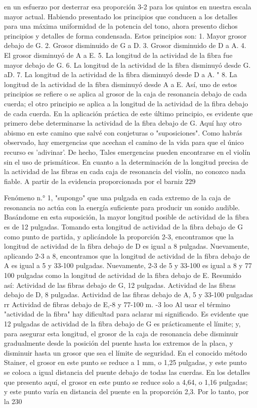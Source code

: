 en un esfuerzo por desterrar esa proporción 3-2 para los quintos
en nuestra escala mayor actual. Habiendo presentado los principios que conducen a los detalles para una máxima uniformidad de la potencia del tono, ahora presento dichos principios y detalles de forma condensada. Estos principios son: 1. Mayor grosor debajo de G. 2. Grosor disminuido de G a D. 3. Grosor disminuido de D a A.
4. El grosor disminuyó de A a E. 5. La longitud de la actividad de la fibra fue mayor debajo de G. 6. La longitud de la actividad de la fibra disminuyó desde G.
aD.
7. La longitud de la actividad de la fibra disminuyó desde D
a A.	"
8. La longitud de la actividad de la fibra disminuyó desde A	
a E.	
Así, uno de estos principios se refiere o se aplica al grosor de la caja de resonancia debajo de cada cuerda; el otro principio se aplica a la longitud de la actividad de la fibra debajo de cada cuerda. En la aplicación práctica de este último principio, es evidente que primero debe determinarse la actividad de la fibra debajo de G. Aquí hay otro abismo en este camino que salvé con conjeturas o "suposiciones". Como habrás observado, hay emergencias que acechan el camino de la vida para
que el único recurso es 'adivinar'. De hecho,
Tales emergencias pueden encontrarse en el violín sin el uso de prismáticos. En cuanto a la determinación de la longitud precisa de la actividad de las fibras en cada caja de resonancia del violín, no conozco nada fiable. A partir de la evidencia proporcionada por el barniz 229

Fenómeno n.° 1, "supongo" que una pulgada en cada extremo de la caja de resonancia no actúa con la energía suficiente para producir un sonido audible. Basándome en esta suposición, la mayor longitud posible de actividad de la fibra es de 12 pulgadas. Tomando esta longitud de actividad de la fibra debajo de G como punto de partida, y aplicándole la proporción 2-3, encontramos que la longitud de actividad de la fibra debajo de D es igual a 8 pulgadas. Nuevamente, aplicando 2-3 a 8, encontramos que la longitud de actividad de la fibra debajo de A es igual a 5 y 33-100 pulgadas. Nuevamente, 2-3 de 5 y 33-100 es igual a 8 y 77 100 pulgadas como la longitud de actividad de la fibra debajo de E.
Resumido así:
Actividad de las fibras debajo de G, 12 pulgadas. Actividad de las fibras debajo de D, 8 pulgadas.
Actividad de las fibras debajo de A, 5 y 33-100 pulgadas rr
Actividad de fibras debajo de E,-8 y 77-100 m. -3 loo
Al usar el término "actividad de la fibra" hay dificultad para aclarar mi significado. Es evidente que 12 pulgadas de actividad de la fibra debajo de G es prácticamente el límite; y, para asegurar esta longitud, el grosor de la caja de resonancia debe disminuir gradualmente desde la posición del puente hasta los extremos de la placa, y disminuir hasta un grosor que sea el límite de seguridad. En el conocido método Stainer, el grosor en este punto se reduce a 1 mm, o 1,25 pulgadas, y este punto se coloca a igual distancia del puente debajo de todas las cuerdas. En los detalles que presento aquí, el grosor en este punto se reduce solo a 4,64, o 1,16 pulgadas; y este punto varía en distancia del puente en la proporción 2,3. Por lo tanto, por la
230

